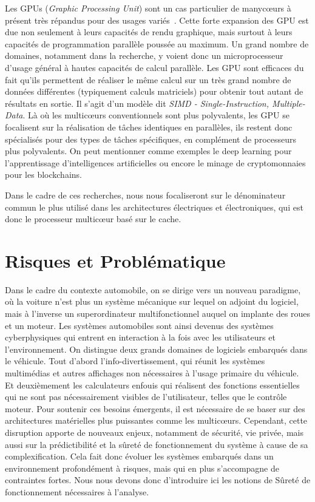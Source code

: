 \documentclass[french, a4paper, 11pt, twoside, pdftex]{StyleThese}
\begin{document}
		Les GPUs (\emph{Graphic Processing Unit}) sont un cas particulier de manycœurs à présent très répandus pour des usages variés~\cite{owens_gpu_2008}. Cette forte expansion des GPU est due non seulement à leurs capacités de rendu graphique, mais surtout à leurs capacités de programmation parallèle poussée au maximum. Un grand nombre de domaines, notamment dans la recherche, y voient donc un microprocesseur d'usage général à hautes capacités de calcul parallèle.
		Les GPU sont efficaces du fait qu'ils permettent de réaliser le même calcul sur un très grand nombre de données différentes (typiquement calculs matriciels) pour obtenir tout autant de résultats en sortie. Il s'agit d'un modèle dit \emph{SIMD - Single-Instruction, Multiple-Data}. Là où les multicœurs conventionnels sont plus polyvalents, les GPU se focalisent sur la réalisation de tâches identiques en parallèles, ils restent donc spécialisés pour des types de tâches spécifiques, en complément de processeurs plus polyvalents. On peut mentionner comme exemples le deep learning pour l'apprentissage d'intelligences artificielles ou encore le minage de cryptomonnaies pour les blockchains.
		
		Dans le cadre de ces recherches, nous nous focaliseront sur le dénominateur commun le plus utilisé dans les architectures électriques et électroniques, qui est donc le processeur multicœur basé sur le cache.
		
\section{Risques et Problématique}
	Dans le cadre du contexte automobile, on se dirige  vers un nouveau paradigme, où la voiture n'est plus un système mécanique sur lequel on adjoint du logiciel, mais à l'inverse un superordinateur multifonctionnel auquel on implante des roues et un moteur. 
	Les systèmes automobiles sont ainsi devenus des systèmes cyberphysiques qui entrent en interaction à la fois avec les utilisateurs et l'environnement. On distingue deux grands domaines de logiciels embarqués dans le véhicule. Tout d'abord l'info-divertissement, qui réunit les systèmes multimédias et autres affichages non nécessaires à l'usage primaire du véhicule. Et deuxièmement les calculateurs enfouis qui réalisent des fonctions essentielles qui ne sont pas nécessairement visibles de l'utilisateur, telles que le contrôle moteur. Pour soutenir ces besoins émergents, il est nécessaire de se baser sur des architectures matérielles plus puissantes comme les multicœurs. Cependant, cette disruption apporte de nouveaux enjeux, notamment de sécurité, vie privée, mais aussi sur la prédictibilité et la sûreté de fonctionnement du système à cause de sa complexification. Cela fait donc évoluer les systèmes embarqués dans un environnement profondément à risques, mais qui en plus s'accompagne de contraintes fortes. Nous nous devons donc d'introduire ici les notions de Sûreté de fonctionnement nécessaires à l'analyse.
\end{document}

